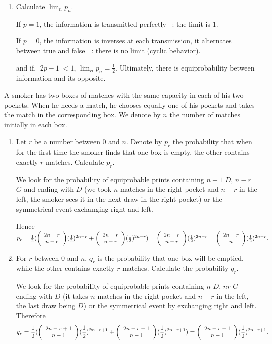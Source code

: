 \documentclass[a4paper,11pt]{exam}
\newcommand{\binomial}[2]{\small{\left(\begin{array}{c} #1 \\ #2\end{array} \right)}}
\begin{document}
\begin{questions}
\begin{enumerate}
	\item Calculate $\lim_n p_n$.
	
	
	\begin{solution}
		If $p=1$, the information is transmitted perfectly ~: the limit is $1$.
		
		If $p=0$, the information is inverses at each transmission, it alternates between true and false ~: there is no limit (cyclic behavior).
		
		and if, $|2p-1|<1$, $\lim_n p_n = \frac{1}{2}$.
		Ultimately, there is equiprobability between information and its opposite.
	\end{solution}
\end{enumerate}



\question

A smoker has two boxes of matches with the same capacity in each of his two pockets.
When he needs a match, he chooses equally one of his pockets and takes the match in the corresponding box.
We denote by $ n $ the number of matches initially in each box.
\begin{enumerate}
	\item Let $r$ be a number between $0$ and $n$. Denote by $p_r$ the probability that when for the first time the smoker finds that one box is empty, the other contains exactly $ r $ matches. Calculate $p_r$.
	
	\begin{solution}
		We look for the probability of equiprobable prints containing $n + 1$ $ D $, $ n-r $ $ G $ and ending with $ D $ (we took $ n $ matches in the right pocket and $ n-r $ in the left, the smoker sees it in the next draw in the right pocket) or the symmetrical event exchanging right and left.
			
		Hence $p_r = \frac{1}{2}(\binomial{2n-r}{n-r} (\frac{1}{2})^{2n-r} + \binomial{2n-r}{n-r} (\frac{1}{2})^{2n-r})
		= \binomial{2n-r}{n-r} (\frac{1}{2})^{2n-r} = \binomial{2n-r}{n} (\frac{1}{2})^{2n-r}.$
	\end{solution}
	
	\item 
	For $ r $ between $ 0 $ and $ n $, $ q_r $ is the probability that one box will be emptied, while the other contains exactly $ r $ matches. Calculate the probability $ q_r $.
	\begin{solution}
		We look for the probability of equiprobable prints containing $ n $ $ D $, $ nr $ $ G $ ending with $ D $ (it takes $ n $ matches in the right pocket and $ n-r $ in the left, the last draw being $ D $) or the symmetrical event by exchanging right and left.
		Therefore
		$$q_r = \frac{1}{2}(\binomial{2n-r+1}{n-1} (\frac{1}{2})^{2n-r+1} + \binomial{2n-r-1}{n-1} (\frac{1}{2})^{2n-r+1}) =
		\binomial{2n-r-1}{n-1} (\frac{1}{2})^{2n-r+1}.$$
	\end{solution}
	

\end{enumerate}
\end{questions}
\end{document}
